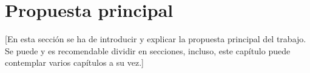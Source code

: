 \chapter{Propuesta principal}\label{cap:propuesta}

[En esta sección se ha de introducir y explicar la propuesta principal del trabajo. Se puede y es recomendable dividir en secciones, incluso, este capítulo puede contemplar varios  capítulos a su vez.]